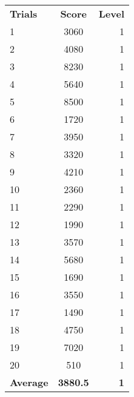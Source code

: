 \documentclass[a4paper,oneside,10pt]{report}
\begin{document}
\begin{table}[h]
\centering
\begin{tabular}{ l | c | r }
\textbf{Trials} & \textbf{Score} & \textbf{Level}\\
1&	3060&	1\\
2&	4080&	1\\
3&	8230&	1\\
4&	5640&	1\\
5&	8500&	1\\
6&	1720&	1\\
7&	3950&	1\\
8&	3320&	1\\
9&	4210&	1\\
10&	2360&	1\\
11&	2290&	1\\
12&	1990&	1\\
13&	3570&	1\\
14&	5680&	1\\
15&	1690&	1\\
16&	3550&	1\\
17&	1490&	1\\
18&	4750&	1\\
19&	7020&	1\\
20&	510&	1\\
\textbf{Average}&	\textbf{3880.5}& \textbf{1}\\
\end{tabular}
\end{table}





\end{document}
